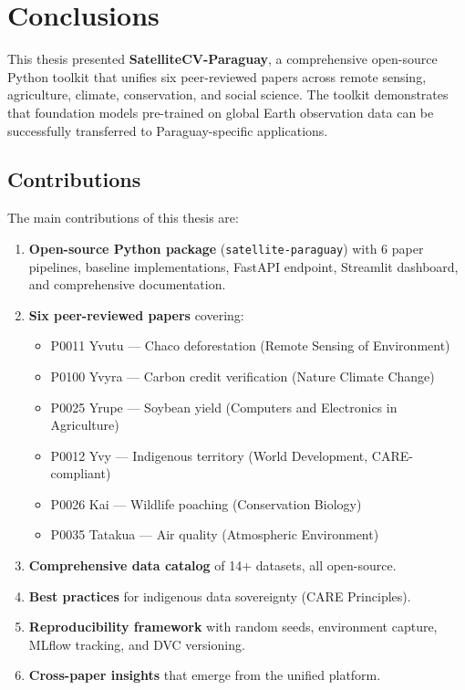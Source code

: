 
\chapter{Conclusions}

This thesis presented \textbf{SatelliteCV-Paraguay}, a comprehensive open-source
Python toolkit that unifies six peer-reviewed papers across remote sensing,
agriculture, climate, conservation, and social science. The toolkit
demonstrates that foundation models pre-trained on global Earth observation
data can be successfully transferred to Paraguay-specific applications.

\section{Contributions}

The main contributions of this thesis are:

\begin{enumerate}
    \item \textbf{Open-source Python package} (\texttt{satellite-paraguay})
    with 6 paper pipelines, baseline implementations, FastAPI endpoint,
    Streamlit dashboard, and comprehensive documentation.

    \item \textbf{Six peer-reviewed papers} covering:
    \begin{itemize}
        \item P0011 Yvutu — Chaco deforestation (Remote Sensing of Environment)
        \item P0100 Yvyra — Carbon credit verification (Nature Climate Change)
        \item P0025 Yrupe — Soybean yield (Computers and Electronics in Agriculture)
        \item P0012 Yvy — Indigenous territory (World Development, CARE-compliant)
        \item P0026 Kai — Wildlife poaching (Conservation Biology)
        \item P0035 Tatakua — Air quality (Atmospheric Environment)
    \end{itemize}

    \item \textbf{Comprehensive data catalog} of 14+ datasets, all open-source.

    \item \textbf{Best practices} for indigenous data sovereignty (CARE Principles).

    \item \textbf{Reproducibility framework} with random seeds, environment
    capture, MLflow tracking, and DVC versioning.

    \item \textbf{Cross-paper insights} that emerge from the unified platform.
\end{enumerate}

